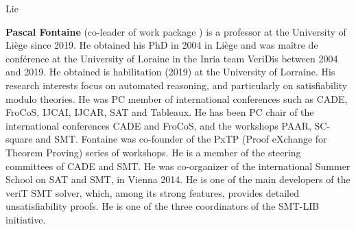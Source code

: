 \begin{sitedescription}{Lie}
\begin{compactitem}
\item{\bf Pascal Fontaine} (co-leader of work package ) is a
  professor at the University of Liège since 2019.  He obtained his PhD in 2004
  in Liège and was maître de conférence at the University of Loraine in the
  Inria team VeriDis between 2004 and 2019.  He obtained is habilitation (2019)
  at the University of Lorraine.  His research interests focus on automated
  reasoning, and particularly on satisfiability modulo theories.  He was PC
  member of international conferences such as CADE, FroCoS, IJCAI, IJCAR, SAT
  and Tableaux.  He has been PC chair of the international conferences CADE and
  FroCoS, and the workshops PAAR, SC-square and SMT.  Fontaine was co-founder of
  the PxTP (Proof eXchange for Theorem Proving) series of workshops.  He is a
  member of the steering committees of CADE and SMT.  He was co-organizer of the
  international Summer School on SAT and SMT, in Vienna 2014.  He is one of the
  main developers of the veriT SMT solver, which, among its strong features,
  provides detailed unsatisfiability proofs.  He is one of the three
  coordinators of the SMT-LIB initiative.
\end{compactitem}

\end{sitedescription}

